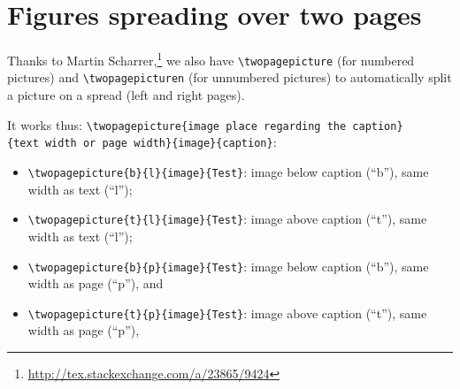 \documentclass[withmarginpar,titleauthor,11pt]{mwart}
\begin{document}
\section{Figures spreading over two pages}

Thanks to Martin Scharrer,\footnote{\url{http://tex.stackexchange.com/a/23865/9424}} 
 we also have \verb|\twopagepicture| (for numbered pictures) and \verb|\twopagepicturen| (for unnumbered pictures) to automatically split a picture on a spread (left and right pages). 

It works thus: \verb|\twopagepicture{image place regarding the caption}|\\ \verb|{text width or page width}{image}{caption}|:

\begin{itemize}
	\item \verb|\twopagepicture{b}{l}{image}{Test}|: image below caption (“b”), same width as text (“l”);
	\item \verb|\twopagepicture{t}{l}{image}{Test}|: image above caption (“t”), same width as text (“l”);
	\item \verb|\twopagepicture{b}{p}{image}{Test}|: image below caption (“b”), same width as page (“p”), and 
	\item \verb|\twopagepicture{t}{p}{image}{Test}|: image above caption (“t”), same width as page (“p”),
\end{itemize}

%
%
%


\printbibliography
\end{document}
